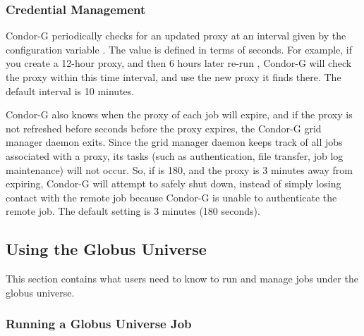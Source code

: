 \subsubsection{\label{sec:Condor-G-Credentials}Credential Management}


Condor-G periodically checks for an updated proxy at
an interval given by the configuration variable
.
The value is defined in terms of seconds.
For example, if you create a 12-hour proxy, and then
6 hours later re-run ,
Condor-G will check the proxy within
this time interval, and use the new proxy it finds there.
The default interval is 10 minutes.

Condor-G also knows when the proxy of each job will expire,
and if the proxy is not refreshed before
seconds before the proxy expires,
the Condor-G grid manager daemon exits.
Since the grid manager daemon keeps track of all jobs
associated with a proxy, its tasks
(such as authentication, file transfer, job log maintenance)
will not occur.
So, if
is 180, and the proxy is 3 minutes away from
expiring, Condor-G will attempt to safely shut down,
instead of simply losing
contact with the remote job because Condor-G is unable to
authenticate the remote job.
The default setting is 3 minutes (180 seconds).

\subsection{\label{sec:Using-Condor-G}Using the Globus Universe}

This section contains what users need to know to 
run and manage jobs under the globus universe.

\subsubsection{\label{sec:Running-CondorG-Job}Running a Globus Universe Job}

